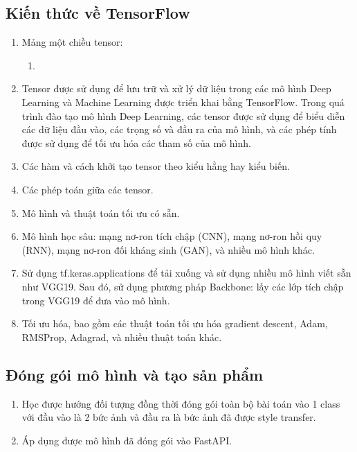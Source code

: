 \documentclass{article}
\begin{document}
\subsection{Kiến thức về TensorFlow}
\vspace{1cm}
\begin{enumerate}
\item Mảng một chiều tensor:
\begin{enumerate}
\item
\end{enumerate}
\item Tensor được sử dụng để lưu trữ và xử lý dữ liệu trong các mô hình Deep Learning và Machine Learning được triển khai bằng TensorFlow. Trong quá trình đào tạo mô hình Deep Learning, các tensor được sử dụng để biểu diễn các dữ liệu đầu vào, các trọng số và đầu ra của mô hình, và các phép tính được sử dụng để tối ưu hóa các tham số của mô hình.
\item Các hàm và cách khởi tạo tensor theo kiểu hằng hay kiểu biến.
\item Các phép toán giữa các tensor.
\item Mô hình và thuật toán tối ưu có sẵn.
\item Mô hình học sâu: mạng nơ-ron tích chập (CNN), mạng nơ-ron hồi quy (RNN), mạng nơ-ron đối kháng sinh (GAN), và nhiều mô hình khác.
\item Sử dụng tf.keras.applications để tải xuống và sử dụng nhiều mô hình viết sẵn như VGG19. Sau đó, sử dụng phương pháp Backbone: lấy các lớp tích chập trong VGG19 để đưa vào mô hình.
\item Tối ưu hóa, bao gồm các thuật toán tối ưu hóa gradient descent, Adam, RMSProp, Adagrad, và nhiều thuật toán khác.
\end{enumerate}

\subsection{Đóng gói mô hình và tạo sản phẩm}
\vspace{1cm}

\begin{enumerate}
\item Học được hướng đối tượng đồng thời đóng gói toàn bộ bài toán vào 1 class với đầu vào là 2 bức ảnh và đầu ra là bức ảnh đã được style transfer.
\item Áp dụng được mô hình đã đóng gói vào FastAPI.
\end{enumerate}

\noindent 
\end{document}

